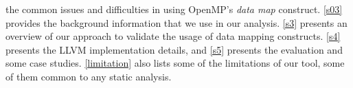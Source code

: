 the common issues and difficulties in using 
OpenMP's \textit{data map} construct. 
\autoref{s03} provides the background information 
that we use in our analysis.
\autoref{s3} presents an overview of our approach to validate 
the usage of data mapping constructs. 
\autoref{s4} presents the LLVM implementation details, and 
\autoref{s5} presents the evaluation and some case studies. 
\autoref{limitation} also lists some of the limitations of 
our tool, some of them common to any static analysis.  
